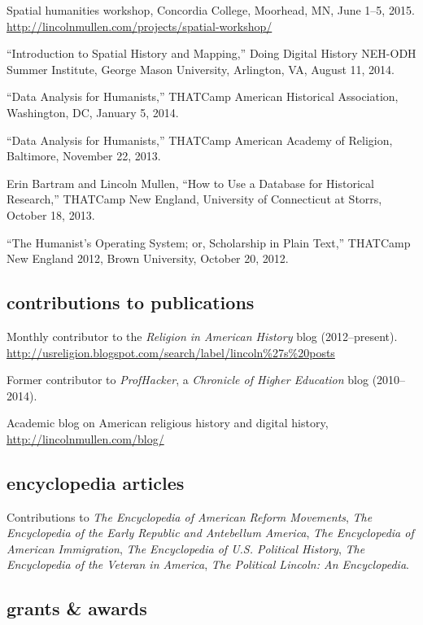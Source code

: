 \documentclass[11pt]{article}
\begin{document}
Spatial humanities workshop, Concordia College, Moorhead, MN, June 1--5, 2015.  
\url{http://lincolnmullen.com/projects/spatial-workshop/}

``Introduction to Spatial History and Mapping,'' Doing Digital History NEH-ODH 
Summer Institute, George Mason University, Arlington, VA, August 11, 2014.

``Data Analysis for Humanists,'' THATCamp American Historical Association, 
Washington, DC, January 5, 2014.

``Data Analysis for Humanists,'' THATCamp American Academy of Religion, 
Baltimore, November 22, 2013.

Erin Bartram and Lincoln Mullen, ``How to Use a Database for Historical 
Research,'' THATCamp New England, University of Connecticut at Storrs, October 
18, 2013.

``The Humanist's Operating System; or, Scholarship in Plain Text,'' THATCamp 
New England 2012, Brown University, October 20, 2012.


\subsection{contributions to
  publications}\label{contributions-to-publications}

Monthly contributor to the \emph{Religion in American History} blog (2012--present). \url{http://usreligion.blogspot.com/search/label/lincoln\%27s\%20posts}

Former contributor to \emph{ProfHacker}, a \emph{Chronicle of Higher 
  Education} blog (2010--2014). 

Academic blog on American religious history and digital history, 
\url{http://lincolnmullen.com/blog/}

\subsection{encyclopedia articles}\label{encyclopedia-articles}

Contributions to \emph{The Encyclopedia of American Reform Movements},
\emph{The Encyclopedia of the Early Republic and Antebellum America},
\emph{The Encyclopedia of American Immigration},
\emph{The Encyclopedia of U.S. Political History},
\emph{The Encyclopedia of the Veteran in America},
\emph{The Political Lincoln: An Encyclopedia}.

\subsection{grants \& awards}\label{grants-awards}
\end{document}
